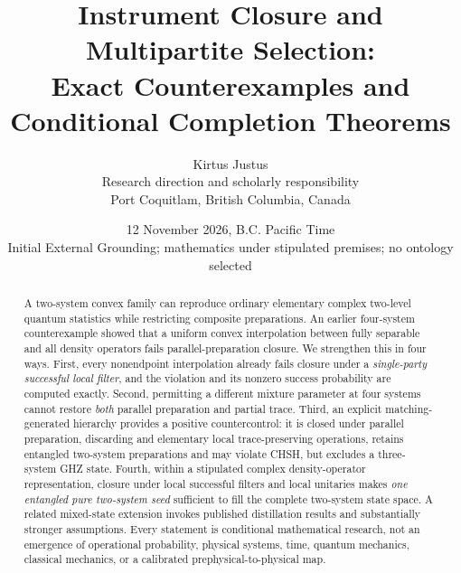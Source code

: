 \documentclass[10pt,letterpaper]{article}
\title{\textbf{Instrument Closure and Multipartite Selection:}\\[4pt]
Exact Counterexamples and Conditional Completion Theorems}
\author{Kirtus Justus\\[-1pt]\small Research direction and scholarly responsibility\\
\small Port Coquitlam, British Columbia, Canada}
\date{12 November 2026, B.C. Pacific Time\\[3pt]
\small Initial External Grounding; mathematics under stipulated premises; no ontology selected}
\begin{document}
\maketitle
\begin{abstract}
A two-system convex family can reproduce ordinary elementary complex two-level
quantum statistics while restricting composite preparations. An earlier four-system
counterexample showed that a uniform convex interpolation between fully separable
and all density operators fails parallel-preparation closure. We strengthen this in
four ways. First, every nonendpoint interpolation already fails closure under a
\emph{single-party successful local filter}, and the violation and its nonzero
success probability are computed exactly. Second, permitting a different mixture
parameter at four systems cannot restore \emph{both} parallel preparation and
partial trace. Third, an explicit matching-generated hierarchy provides a positive
countercontrol: it is closed under parallel preparation, discarding and elementary
local trace-preserving operations, retains entangled two-system preparations and
may violate CHSH, but excludes a three-system GHZ state. Fourth, within a stipulated
complex density-operator representation, closure under local successful filters
and local unitaries makes \emph{one entangled pure two-system seed} sufficient to
fill the complete two-system state space. A related mixed-state extension invokes
published distillation results and substantially stronger assumptions. Every
statement is conditional mathematical research, not an emergence of operational
probability, physical systems, time, quantum mechanics, classical mechanics, or a
calibrated prephysical-to-physical map.
\end{abstract}
\end{document}

